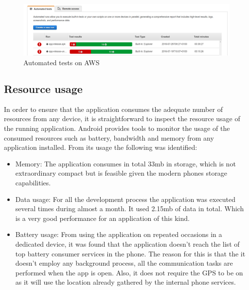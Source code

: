\begin{figure}[H]
\begin{adjustbox}{width=1\textwidth,center=\textwidth}
  \centering
  \includegraphics[scale=1]{images/automated_tests.png}
\end{adjustbox}
  \caption[Automated tests on AWS]{Automated tests on AWS}
  \label{fig:automated_tests}
\end{figure}

\subsection{Resource usage}
In order to ensure that the application consumes the adequate number of resources from any device, it is straightforward to inspect the resource usage of the running application. Android provides tools to monitor the usage of the consumed resources such as battery, bandwidth and memory from any application installed. From its usage the following was identified:
\begin{itemize}
	\item Memory: The application consumes in total 33mb in storage, which is not extraordinary compact but is feasible given the modern phones storage capabilities. 
    \item Data usage: For all the development process the application was executed several times during almost a month. It used 2.15mb of data in total. Which is a very good performance for an application of this kind.
    \item Battery usage: From using the application on repeated occasions in a dedicated device, it was found that the application doesn't reach the list of top battery consumer services in the phone. The reason for this is that the it doesn't employ any background process, all the communication tasks are performed when the app is open. Also, it does not require the GPS to be on as it will use the location already gathered by the internal phone services.
\end{itemize}


